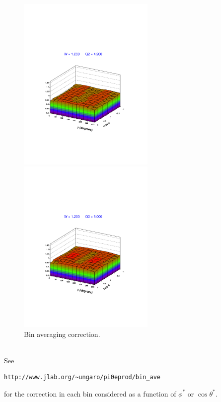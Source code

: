 \begin{figure}[h]
 \\
 \vspace{0.1cm}
 \begin{minipage}{7cm} \includegraphics[width = 6.6cm, bb=60 130 520 570]{analysis/img/binave3} \end{minipage}
 \hspace{1cm}
 \begin{minipage}{7cm} \includegraphics[width = 6.6cm, bb=60 130 520 570]{analysis/img/binave4} \end{minipage}    
  \caption
          { Bin averaging correction.}  
 \label{fig:bin_averaging}
\end{figure}  \\
See    \begin{verbatim} 
http://www.jlab.org/~ungaro/pi0eprod/bin_ave
\end{verbatim}
for the correction in each bin considered as a function of $\phi^*$ or $\cos\theta^*$.







